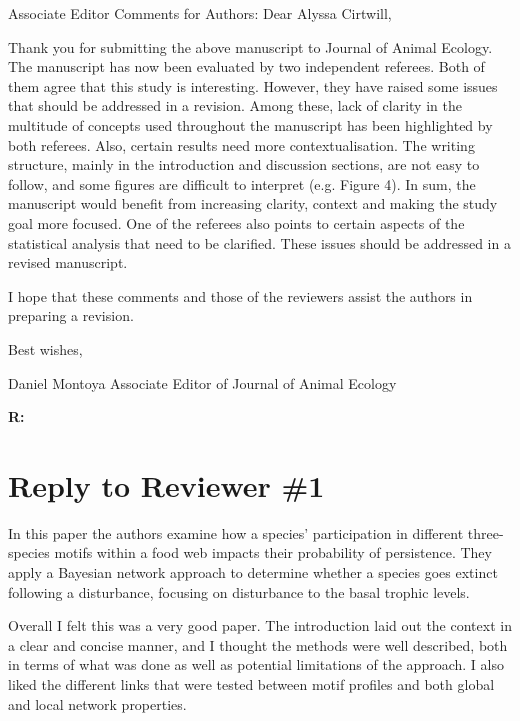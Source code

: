 \documentclass[12pt]{article}
\newenvironment{refquote}{\bigskip \begin{it}}{\end{it}\medskip}
\begin{document}
    \begin{refquote}

        Associate Editor Comments for Authors:
        Dear Alyssa Cirtwill,

        Thank you for submitting the above manuscript to Journal of Animal Ecology. The manuscript has now been evaluated by two independent referees. Both of them agree that this study is interesting. However, they have raised some issues that should be addressed in a revision. Among these, lack of clarity in the multitude of concepts used throughout the manuscript has been highlighted by both referees. Also, certain results need more contextualisation. The writing structure, mainly in the introduction and discussion sections, are not easy to follow, and some figures are difficult to interpret (e.g. Figure 4). In sum, the manuscript would benefit from increasing clarity, context and making the study goal more focused. One of the referees also points to certain aspects of the statistical analysis that need to be clarified. These issues should be addressed in a revised manuscript.

        I hope that these comments and those of the reviewers assist the authors in preparing a revision.

        Best wishes,

        Daniel Montoya
        Associate Editor of Journal of Animal Ecology

    \end{refquote}


    \textbf{R:}


\clearpage

\section*{Reply to Reviewer \#1}

    \begin{refquote}

        In this paper the authors examine how a species' participation in different three-species motifs within a food web impacts their probability of persistence. They apply a Bayesian network approach to determine whether a species goes extinct following a disturbance, focusing on disturbance to the basal trophic levels.

        Overall I felt this was a very good paper. The introduction laid out the context in a clear and concise manner, and I thought the methods were well described, both in terms of what was done as well as potential limitations of the approach. I also liked the different links that were tested between motif profiles and both global and local network properties. 

    \end{refquote}
\end{document}
